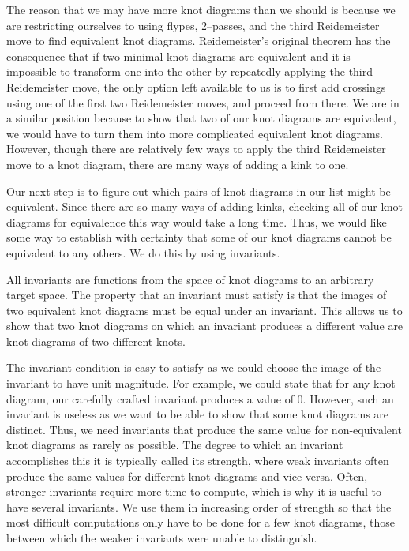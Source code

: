 \begin{paper}
The reason that we may have more knot diagrams than we should is because we are
restricting ourselves to using flypes, 2--passes, and the third Reidemeister
move to find equivalent knot diagrams.
Reidemeister's original theorem has the consequence that if two minimal knot
diagrams are equivalent and it is impossible to transform one into the other by
repeatedly applying the third Reidemeister move, the only option left available
to us is to first add crossings using one of the first two Reidemeister moves,
and proceed from there.
We are in a similar position because to show that two of our knot diagrams are
equivalent, we would have to turn them into more complicated equivalent knot
diagrams.
However, though there are relatively few ways to apply the third Reidemeister
move to a knot diagram, there are many ways of adding a kink to one.

Our next step is to figure out which pairs of knot diagrams in our list might be
equivalent.
Since there are so many ways of adding kinks, checking all of our knot diagrams
for equivalence this way would take a long time.
Thus, we would like some way to establish with certainty that some of our knot
diagrams cannot be equivalent to any others.
We do this by using invariants.


All invariants are functions from the space of knot diagrams to an arbitrary
target space.
The property that an invariant must satisfy is that the images of two equivalent
knot diagrams must be equal under an invariant.
This allows us to show that two knot diagrams on which an invariant produces a
different value are knot diagrams of two different knots.

The invariant condition is easy to satisfy as we could choose the image of the
invariant to have unit magnitude.
For example, we could state that for any knot diagram, our carefully crafted
invariant produces a value of 0.
However, such an invariant is useless as we want to be able to show that some
knot diagrams are distinct.
Thus, we need invariants that produce the same value for non-equivalent knot
diagrams as rarely as possible.
The degree to which an invariant accomplishes this it is typically called its
strength, where weak invariants often produce the same values for different knot
diagrams and vice versa.
Often, stronger invariants require more time to compute, which is why it is
useful to have several invariants.
We use them in increasing order of strength so that the most difficult
computations only have to be done for a few knot diagrams, those between which
the weaker invariants were unable to distinguish.


\end{paper}
